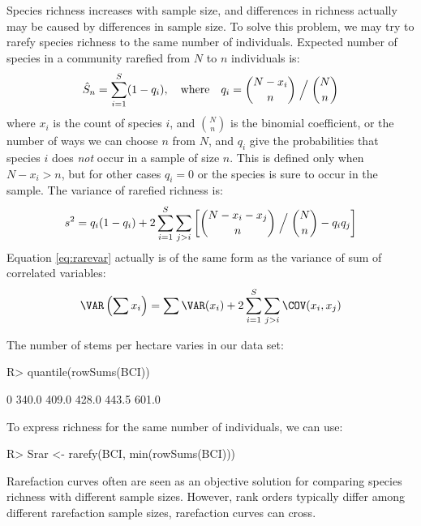 \documentclass[article,nojss]{jss}
\begin{document}
Species richness increases with sample size, and differences in
richness actually may be caused by differences in sample size.  To
solve this problem, we may try to rarefy species richness to the same
number of individuals.  Expected number of species in a community
rarefied from $N$ to $n$ individuals is:
\begin{equation}
\label{eq:rare}
\hat S_n = \sum_{i=1}^S (1 - q_i),\quad \text{where} \quad q_i = {N-x_i
  \choose n} \Bigm /{N \choose n}
\end{equation}
where $x_i$ is the count of species $i$, and ${N \choose n}$ is the
binomial coefficient, or the number of ways we can choose $n$ from
$N$, and $q_i$ give the probabilities that species $i$ does \emph{not} occur in a
sample of size $n$.  This is defined only when $N-x_i > n$, but for
other cases $q_i = 0$ or the species is sure to occur in the sample.
The variance of rarefied richness is:
\begin{equation}
\label{eq:rarevar}
s^2 = q_i (1-q_i) + 2 \sum_{i=1}^S \sum_{j>i} \left[ {N- x_i - x_j
    \choose n} \Bigm / {N
    \choose n} - q_i q_j\right]
\end{equation}
Equation \ref{eq:rarevar} actually is of the same form as the variance
of sum of correlated variables:
\begin{equation}
\VAR \left(\sum x_i \right) = \sum \VAR (x_i) + 2 \sum_{i=1}^S
\sum_{j>i} \COV (x_i, x_j)
\end{equation}

The number of stems per hectare varies in our
data set:
\begin{Schunk}
\begin{Sinput}
R> quantile(rowSums(BCI))
\end{Sinput}
\begin{Soutput}
   0%   25%   50%   75%  100% 
340.0 409.0 428.0 443.5 601.0 
\end{Soutput}
\end{Schunk}
To express richness for the same number of individuals, we can use:
\begin{Schunk}
\begin{Sinput}
R> Srar <- rarefy(BCI, min(rowSums(BCI)))
\end{Sinput}
\end{Schunk}
Rarefaction curves often are seen as an objective solution for
comparing species richness with different sample sizes.  However, rank
orders typically differ among different rarefaction sample sizes,
rarefaction curves can cross.
\end{document}
